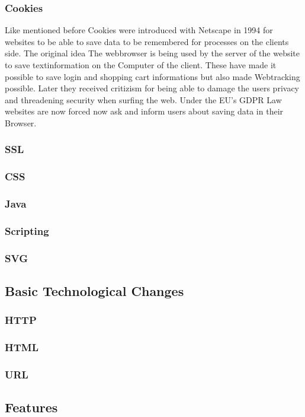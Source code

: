 \documentclass[runningheads]{llncs}
\begin{document}
			\subsubsection{Cookies}
			Like mentioned before Cookies were introduced with Netscape in 1994 for websites to be able to save data to be remembered for processes on the clients side. The original idea The webbrowser is being used by the server of the website to save textinformation on the Computer of the client. These have made it possible to save login and shopping cart informations but also made Webtracking possible. Later they received critizism for being able to damage the users privacy and threadening security when surfing the web. Under the EU's GDPR Law websites are now forced now ask and inform users about saving data in their Browser.
			\subsubsection{SSL}
			\subsubsection{CSS}
			\subsubsection{Java}
			\subsubsection{Scripting}
			\subsubsection{SVG}
		\subsection{Basic Technological Changes}
			\subsubsection{HTTP}
			\subsubsection{HTML}
			\subsubsection{URL}
		\subsection{Features}
\end{document}
